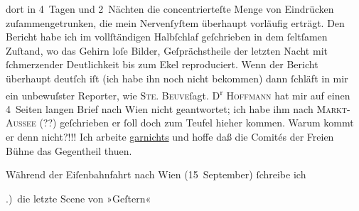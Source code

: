                dort in 4 Tagen und 2 Nächten die concentrierteſte Menge von Eindrücken
               zuſammengetrunken, die mein Nervenſyſtem überhaupt vorläufig erträgt. Den Bericht
               habe ich im vollſtändigen Halbſchlaf geſchrieben in dem{ }ſeltſamen Zuſtand, wo das
               Gehirn loſe Bilder, Geſprächstheile der letzten Nacht mit{ }ſchmerzender Deutlichkeit
               bis zum Ekel reproduciert. Wenn der Bericht überhaupt deutſch iſt (ich habe ihn noch
               nicht bekommen) dann{ }ſchläft in mir ein unbewuſster Reporter, \label{K_L00026-4v}\label{K_L00026-4} wie \textsc{Ste. Beuve}ſagt. D\textsuperscript{r}{ }\textsc{Hoffmann} hat mir auf einen 4 Seiten langen Brief nach Wien nicht geantwortet; ich habe ihm nach {\pb}\textsc{Markt-Aussee} (??) geſchrieben er{ }ſoll doch zum Teufel hieher kommen. Warum kommt er denn
               nicht?!!! Ich arbeite \uline{garnichts} und hoffe daß die
               Comités der Freien Bühne das Gegentheil
               thuen.\pend
           
\pstart
           Während der Eiſenbahnfahrt nach Wien
                  (15 September){ }ſchreibe ich\pend
           
.) die letzte Scene von »Geſtern«\pend
           

